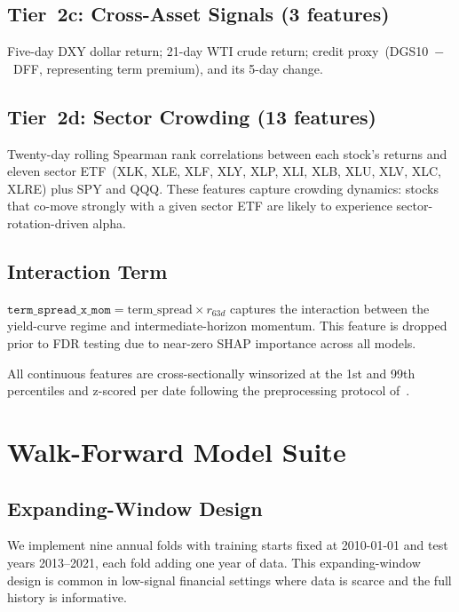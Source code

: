 \documentclass[journal]{IEEEtran}
\begin{document}
\subsection{Tier~2c: Cross-Asset Signals (3 features)}
Five-day DXY dollar return; 21-day WTI crude return; credit
proxy~(DGS10~$-$~DFF, representing term premium), and its 5-day
change.

\subsection{Tier~2d: Sector Crowding (13 features)}
Twenty-day rolling Spearman rank correlations between each stock's
returns and eleven sector ETF~(XLK, XLE, XLF, XLY, XLP, XLI, XLB,
XLU, XLV, XLC, XLRE) plus SPY and QQQ.
These features capture crowding dynamics: stocks that co-move
strongly with a given sector ETF are likely to experience
sector-rotation-driven alpha.

\subsection{Interaction Term}
$\texttt{term\_spread\_x\_mom} = \text{term\_spread} \times r_{63d}$
captures the interaction between the yield-curve regime and
intermediate-horizon momentum.
This feature is dropped prior to FDR testing due to near-zero SHAP
importance across all models.

All continuous features are cross-sectionally winsorized at the 1st
and 99th percentiles and z-scored per date following the
preprocessing protocol of~\citet{gkx2020}.

\section{Walk-Forward Model Suite}
\label{sec:models}

\subsection{Expanding-Window Design}
We implement nine annual folds with training starts fixed at
2010-01-01 and test years 2013--2021, each fold adding one year of
data.
This expanding-window design is common in low-signal financial
settings where data is scarce and the full history is informative.
\end{document}
